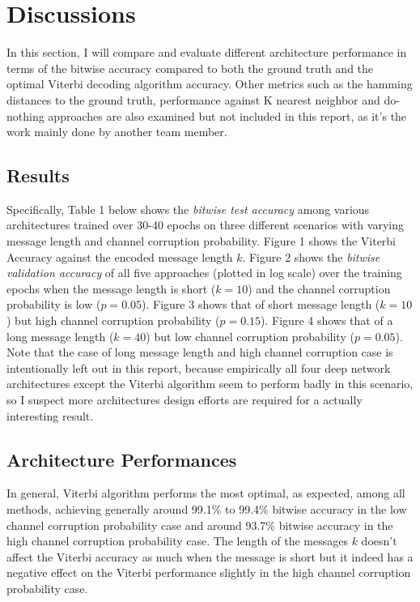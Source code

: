 \documentclass[10pt,twocolumn,letterpaper]{article}
\begin{document}

\section{Discussions}

In this section, I will compare and evaluate different architecture performance in terms of the bitwise accuracy compared to both the ground truth and the optimal Viterbi decoding algorithm accuracy. Other metrics such as the hamming distances to the ground truth, performance against K nearest neighbor and do-nothing approaches are also examined but not included in this report, as it's the work mainly done by another team member. 

\subsection{Results}

Specifically, Table 1 below shows the \textit{bitwise test accuracy} among various architectures trained over 30-40 epochs on three different scenarios with varying message length and channel corruption probability. Figure 1 shows the Viterbi Accuracy against the encoded message length $k$. Figure 2 shows the \textit{bitwise validation accuracy} of all five approaches (plotted in log scale) over the training epochs when the message length is short ($k=10$) and the channel corruption probability is low ($p=0.05$). Figure 3 shows that of short message length ($k=10$) but high channel corruption probability ($p=0.15$). Figure 4 shows that of a long message length ($k=40$) but low channel corruption probability ($p=0.05$). Note that the case of long message length and high channel corruption case is intentionally left out in this report, because empirically all four deep network architectures except the Viterbi algorithm seem to perform badly in this scenario, so I suspect more architectures design efforts are required for a actually interesting result.

\subsection{Architecture Performances}

In general, Viterbi algorithm performs the most optimal, as expected, among all methods, achieving generally around 99.1\% to 99.4\% bitwise accuracy in the low channel corruption probability case and around 93.7\% bitwise accuracy in the high channel corruption probability case. The length of the messages $k$ doesn't affect the Viterbi accuracy as much when the message is short but it indeed has a negative effect on the Viterbi performance slightly in the high channel corruption probability case.
\end{document}
